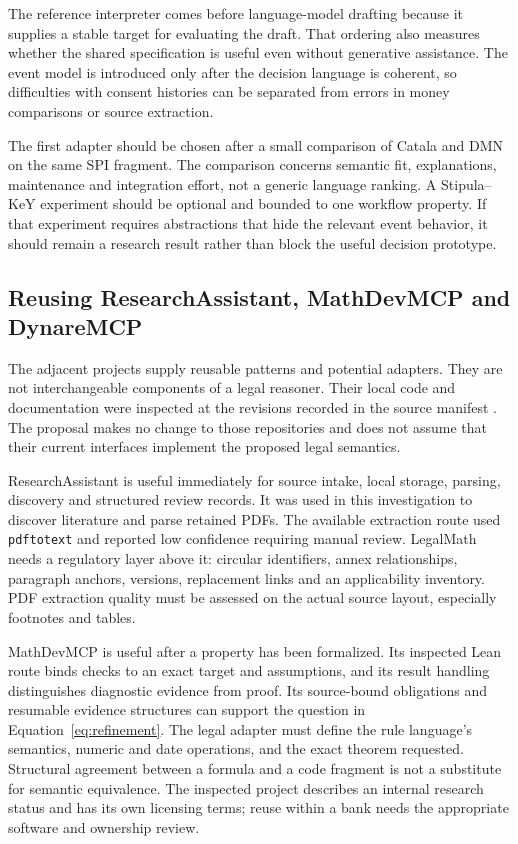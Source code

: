 \endgroup

The reference interpreter comes before language-model drafting because it supplies
a stable target for evaluating the draft. That ordering also measures whether the
shared specification is useful even without generative assistance. The event
model is introduced only after the decision language is coherent, so difficulties
with consent histories can be separated from errors in money comparisons or
source extraction.

The first adapter should be chosen after a small comparison of Catala and DMN on
the same SPI fragment. The comparison concerns semantic fit, explanations,
maintenance and integration effort, not a generic language ranking. A Stipula--KeY
experiment should be optional and bounded to one workflow property. If that
experiment requires abstractions that hide the relevant event behavior, it
should remain a research result rather than block the useful decision prototype.

\subsection{Reusing ResearchAssistant, MathDevMCP and DynareMCP}

The adjacent projects supply reusable patterns and potential adapters. They are
not interchangeable components of a legal reasoner. Their local code and
documentation were inspected at the revisions recorded in the source manifest
\citep{localrepos}. The proposal makes no change to those repositories and does
not assume that their current interfaces implement the proposed legal semantics.

ResearchAssistant is useful immediately for source intake, local storage, parsing,
discovery and structured review records. It was used in this investigation to
discover literature and parse retained PDFs. The available extraction route used
\texttt{pdftotext} and reported low confidence requiring manual review. LegalMath
needs a regulatory layer above it: circular identifiers, annex relationships,
paragraph anchors, versions, replacement links and an applicability inventory.
PDF extraction quality must be assessed on the actual source layout, especially
footnotes and tables.

MathDevMCP is useful after a property has been formalized. Its inspected Lean
route binds checks to an exact target and assumptions, and its result handling
distinguishes diagnostic evidence from proof. Its source-bound obligations and
resumable evidence structures can support the question in
Equation~\eqref{eq:refinement}. The legal adapter must define the rule language's
semantics, numeric and date operations, and the exact theorem requested. Structural
agreement between a formula and a code fragment is not a substitute for semantic
equivalence. The inspected project describes an internal research status and
has its own licensing terms; reuse within a bank needs the appropriate software
and ownership review.

